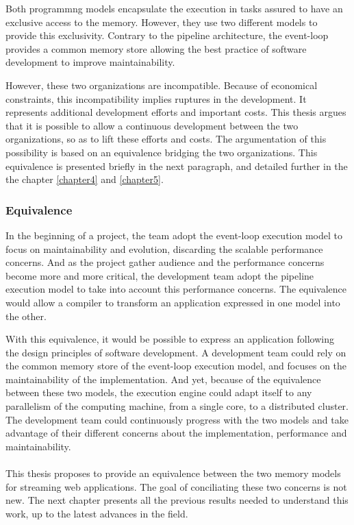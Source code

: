 Both programmng models encapsulate the execution in tasks assured to have an exclusive access to the memory.
However, they use two different models to provide this exclusivity.
Contrary to the pipeline architecture, the event-loop provides a common memory store allowing the best practice of software development to improve maintainability.

However, these two organizations are incompatible.
Because of economical constraints, this incompatibility implies ruptures in the development.
It represents additional development efforts and important costs.
This thesis argues that it is possible to allow a continuous development between the two organizations, so as to lift these efforts and costs.
The argumentation of this possibility is based on an equivalence bridging the two organizations.
This equivalence is presented briefly in the next paragraph, and detailed further in the the chapter \ref{chapter4} and \ref{chapter5}.

\subsubsection{Equivalence}

In the beginning of a project, the team adopt the event-loop execution model to focus on maintainability and evolution, discarding the scalable performance concerns.
And as the project gather audience and the performance concerns become more and more critical, the development team adopt the pipeline execution model to take into account this performance concerns.
The equivalence would allow a compiler to transform an application expressed in one model into the other.

With this equivalence, it would be possible to express an application following the design principles of software development.
A development team could rely on the common memory store of the event-loop execution model, and focuses on the maintainability of the implementation.
And yet, because of the equivalence between these two models, the execution engine could adapt itself to any parallelism of the computing machine, from a single core, to a distributed cluster.
The development team could continuously progress with the two models and take advantage of their different concerns about the implementation, performance and maintainability.

\paragraph{}

This thesis proposes to provide an equivalence between the two memory models for streaming web applications.
The goal of conciliating these two concerns is not new.
The next chapter presents all the previous results needed to understand this work, up to the latest advances in the field.